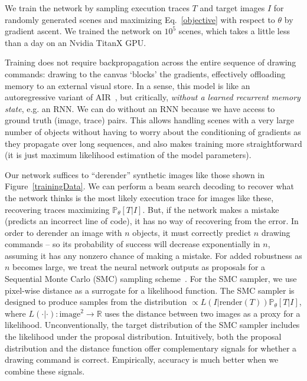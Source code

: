 \documentclass{article}
\newcommand{\probability}{\mathds{P}} %
\begin{document}
We train the network by sampling execution traces $T$ and target
images $I$ for randomly generated scenes
and maximizing
Eq.~\ref{objective} with respect to $\theta$ by gradient ascent.
We trained the network on $10^5$ scenes, which takes a little less than a day on an Nvidia TitanX GPU.

Training does not require backpropagation across the entire sequence
of drawing commands: drawing to the canvas `blocks' the gradients,
effectively offloading memory to an external visual store.  In a
sense, this model is like an autoregressive variant of
AIR~\cite{eslami1603attend}, but critically, \emph{without a learned
  recurrent memory state}, e.g. an RNN.  We can do without an RNN
because we have access to ground truth (image, trace) pairs.  This
allows handling scenes with a very large number of objects without
having to worry about the conditioning of gradients as they propagate
over long sequences, and also makes training more straightforward (it
is just maximum likelihood estimation of the model parameters).



Our network suffices to ``derender'' synthetic images like those shown in
Figure~\ref{trainingData}.  We can perform a beam search decoding to
recover what the network thinks is the most likely execution trace for
images like these, recovering traces maximizing $\probability_\theta
[T|I]$. But, if the network makes a mistake (predicts an incorrect
line of code), it has no way of recovering from the error.  In order
to derender an image with $n$ objects, it must correctly predict $n$
drawing commands -- so its probability of success will decrease
exponentially in $n$, assuming it has any nonzero chance of making a
mistake.  For added robustness as $n$ becomes large, we treat the
neural network outputs as proposals for a Sequential Monte Carlo (SMC) sampling scheme~\cite{SMCBook}.  For
the SMC sampler, we use pixel-wise distance as a surrogate for a
likelihood function. The SMC sampler is designed to produce samples
from the distribution $\propto L(I|\text{render}(T))
\probability_\theta[T|I]$, where $L(\cdot | \cdot):\text{image}^2\to
\mathbb{R}$ uses the distance between two images as a proxy for a
likelihood. Unconventionally, the target distribution of the SMC sampler
includes the likelihood under the proposal distribution.
Intuitively, both the proposal
distribution and the distance function offer complementary signals for
whether a drawing command is correct. Empirically, accuracy is much
better when we combine these signals.
\end{document}
